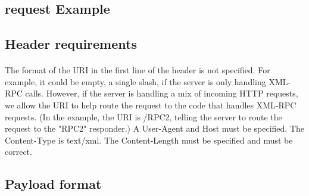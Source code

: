 \documentclass[12pt,a4paper,class,twoside,openany]{report}
\begin{document}
{\subsection{request Example}
\subsection{Header requirements}
  \paragraph*{\hspace{.9 cm} } The format of the URI in the first line of the header is not specified. For example, it could be empty, a single slash, if the server is only handling XML-RPC calls. However, if the server is handling a mix of incoming HTTP requests, we allow the URI to help route the request to the code that handles XML-RPC requests. (In the example, the URI is /RPC2, telling the server to route the request to the "RPC2" responder.)
A User-Agent and Host must be specified. 
The Content-Type is text/xml. 
The Content-Length must be specified and must be correct.
\subsection{Payload format}
}
\end{document}
